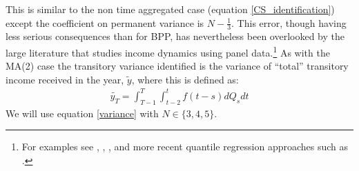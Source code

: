 \documentclass[titlepage]{\econtex}\newcommand{\texname}{ConsumptionHeterogeneity}
\begin{document}
This is similar to the non time aggregated case (equation \ref{CS_identification}) except the coefficient on permanent variance is $N-\frac{1}{3}$. This error, though having less serious consequences than for BPP, has nevertheless been overlooked by the large literature that studies income dynamics using panel data.\footnote{For examples see \cite{moffitt_trends_2012}, \cite{meghir_income_2004}, \cite{nielsen_impact_2004}, \cite{heathcote_unequal_2010} and more recent quantile regression approaches such as \cite{arellano_earnings_2017}.} As with the MA(2) case the transitory variance identified is the variance of ``total'' transitory income received in the year, $\tilde{y}$, where this is defined as:
\begin{align}
\tilde{y_T} = \int_{T-1}^{T}\int_{t-2}^{t} f(t-s)dQ_s dt \label{tot_income}
\end{align}
We will use equation \ref{variance} with $N \in \{3,4,5\}$.
\end{document}
